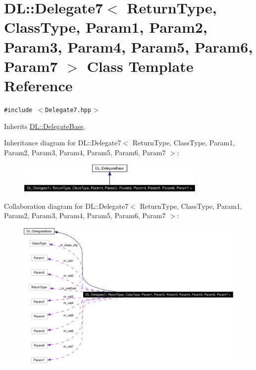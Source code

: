 \hypertarget{classDL_1_1Delegate7}{
\section{DL::Delegate7$<$ Return\-Type, Class\-Type, Param1, Param2, Param3, Param4, Param5, Param6, Param7 $>$ Class Template Reference}
\label{classDL_1_1Delegate7}
}
{\tt \#include $<$Delegate7.hpp$>$}

Inherits \hyperlink{classDL_1_1DelegateBase}{DL::Delegate\-Base}.

Inheritance diagram for DL::Delegate7$<$ Return\-Type, Class\-Type, Param1, Param2, Param3, Param4, Param5, Param6, Param7 $>$:\begin{figure}[H]
\begin{center}
\leavevmode
\includegraphics[width=260pt]{classDL_1_1Delegate7__inherit__graph}
\end{center}
\end{figure}
Collaboration diagram for DL::Delegate7$<$ Return\-Type, Class\-Type, Param1, Param2, Param3, Param4, Param5, Param6, Param7 $>$:\begin{figure}[H]
\begin{center}
\leavevmode
\includegraphics[width=355pt]{classDL_1_1Delegate7__coll__graph}
\end{center}
\end{figure}
